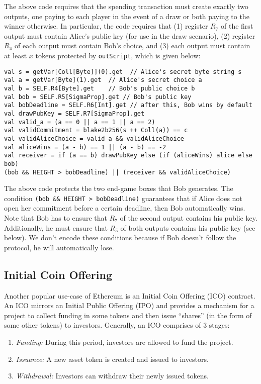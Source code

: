 \documentclass[runningheads]{llncs}
\begin{document}
The above code requires that the spending transaction must create exactly two outputs, one paying to each player in the event of a draw or both paying to the winner otherwise. In particular, the code requires that (1) register $R_7$ of the first output must contain Alice's public key (for use in the draw scenario), (2) register $R_4$ of each output must contain Bob's choice, and (3) each output must contain at least $x$ tokens protected by \texttt{outScript}, which is given below:

\small{
\begin{verbatim}
val s = getVar[Coll[Byte]](0).get  // Alice's secret byte string s
val a = getVar[Byte](1).get  // Alice's secret choice a
val b = SELF.R4[Byte].get    // Bob's public choice b
val bob = SELF.R5[SigmaProp].get // Bob's public key
val bobDeadline = SELF.R6[Int].get // after this, Bob wins by default
val drawPubKey = SELF.R7[SigmaProp].get
val valid_a = (a == 0 || a == 1 || a == 2) 
val validCommitment = blake2b256(s ++ Coll(a)) == c   
val validAliceChoice = valid_a && validAliceChoice
val aliceWins = (a - b) == 1 || (a - b) == -2
val receiver = if (a == b) drawPubKey else (if (aliceWins) alice else bob)
(bob && HEIGHT > bobDeadline) || (receiver && validAliceChoice)
\end{verbatim}
}


The above code protects the two end-game boxes that Bob generates. The condition \texttt{(bob \&\& HEIGHT > bobDeadline)} guarantees that if Alice does not open her commitment before a certain deadline, then Bob automatically wins. 
Note that Bob has to ensure that $R_7$ of the second output contains his public key. Additionally, he must ensure that $R_5$ of both outputs contains his public key (see below). We don't encode these conditions because if Bob doesn't follow the protocol, he will automatically lose.
\subsection{Initial Coin Offering}
\label{ico}

Another popular use-case of Ethereum is an Initial Coin Offering (ICO) contract. %
An ICO mirrors an Initial Public Offering (IPO) and provides a mechanism for a project to collect funding in some tokens and then issue ``shares'' (in the form of some other tokens) to investors. Generally, an ICO comprises of 3 stages:
\begin{enumerate}
	\item {\em Funding:} During this period, investors are allowed to fund the project.
	\item {\em Issuance:} A new asset token is created and issued to investors.
	\item {\em Withdrawal:} Investors can withdraw their newly issued tokens. 
\end{enumerate}
\end{document}
